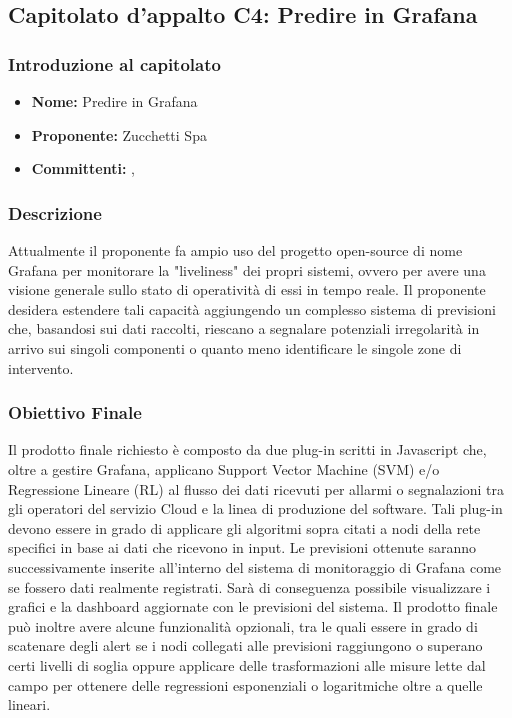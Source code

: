 \subsection{Capitolato d'appalto C4: Predire in Grafana}
	\subsubsection{Introduzione al capitolato}
	\begin{itemize}
		\item \textbf{Nome:} Predire in Grafana
		\item \textbf{Proponente:} Zucchetti Spa
		\item \textbf{Committenti:} \TV, \RC
	\end{itemize}
	
	\subsubsection{Descrizione}
	Attualmente il proponente fa ampio uso del progetto open-source di 	nome Grafana per monitorare la "liveliness" dei propri sistemi, ovvero per avere una visione generale sullo stato di operatività di essi in tempo reale. Il proponente desidera estendere tali capacità aggiungendo un complesso sistema di previsioni che, basandosi sui dati raccolti, riescano a segnalare potenziali irregolarità in arrivo sui singoli componenti o quanto meno identificare le singole zone di intervento.
	
	\subsubsection{Obiettivo Finale}
	Il prodotto finale richiesto è composto da due plug-in scritti in Javascript che, oltre a gestire Grafana, applicano Support Vector Machine (SVM) e/o Regressione Lineare (RL) al flusso dei dati ricevuti per allarmi o segnalazioni tra gli operatori del servizio Cloud e la linea di produzione del software. Tali plug-in devono essere in grado di applicare gli algoritmi sopra citati a nodi della rete specifici in base ai dati che ricevono in input. Le previsioni ottenute saranno successivamente inserite all'interno del sistema di monitoraggio di Grafana come se fossero dati realmente registrati. Sarà di conseguenza possibile visualizzare i grafici e la dashboard aggiornate con le previsioni del sistema. Il prodotto  finale può inoltre avere alcune funzionalità opzionali, tra le quali essere in grado di scatenare degli alert se i nodi collegati alle previsioni raggiungono o superano certi livelli di soglia oppure applicare delle trasformazioni alle misure lette dal campo per ottenere delle regressioni esponenziali o logaritmiche oltre a quelle lineari.
	

